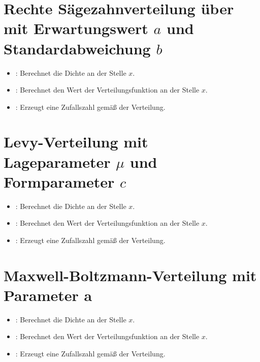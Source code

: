 \section{Rechte Sägezahnverteilung über mit Erwartungswert \texorpdfstring{$a$}{a} und Standardabweichung \texorpdfstring{$b$}{b}}

\begin{itemize}

\item
{}:
Berechnet die Dichte an der Stelle $x$.

\item
{}:
Berechnet den Wert der Verteilungsfunktion an der Stelle $x$.

\item
{}:
Erzeugt eine Zufallszahl gemäß der Verteilung.

\end{itemize}



\section{Levy-Verteilung mit Lageparameter \texorpdfstring{$\mu$}{mu} und Formparameter \texorpdfstring{$c$}{c}}

\begin{itemize}

\item
{}:
Berechnet die Dichte an der Stelle $x$.

\item
{}:
Berechnet den Wert der Verteilungsfunktion an der Stelle $x$.

\item
{}:
Erzeugt eine Zufallszahl gemäß der Verteilung.

\end{itemize}



\section{Maxwell-Boltzmann-Verteilung mit Parameter a}

\begin{itemize}

\item
{}:
Berechnet die Dichte an der Stelle $x$.

\item
{}:
Berechnet den Wert der Verteilungsfunktion an der Stelle $x$.

\item
{}:
Erzeugt eine Zufallszahl gemäß der Verteilung.

\end{itemize}



